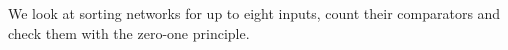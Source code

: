 We look at sorting networks for up to eight inputs, count their comparators and
check them with the zero-one principle.
